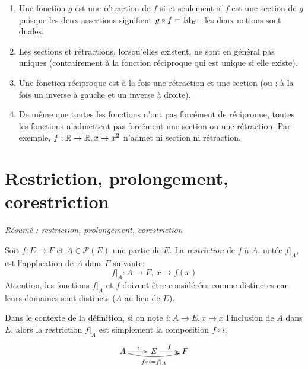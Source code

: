 \begin{remarque}
\begin{enumerate}
\item Une fonction $g$ est une rétraction de $f$ si et seulement si $f$ est une section de $g$ puisque les deux assertions signifient $g\circ f = \operatorname{Id}_E$ : les deux notions sont \og duales\fg.
\item Les sections et rétractions, lorsqu'elles existent, ne sont en général pas uniques (contrairement à la fonction réciproque qui est unique si elle existe).
\item Une fonction réciproque est à la fois une rétraction et une section (ou : à la fois un inverse à gauche et un inverse à droite).
\item De même que toutes les fonctions n'ont pas forcément de réciproque, toutes les fonctions n'admettent pas forcément une section ou une rétraction. Par exemple, $f : \mathbb{R}\to \mathbb{R}, x\mapsto x^2$ n'admet ni section ni rétraction. 
\end{enumerate}
\end{remarque}




\section{Restriction, prolongement, corestriction}

\emph{Résumé : restriction, prolongement, corestriction}

\begin{definition}[Restriction]
\label{def-restriction}
Soit $f : E\to F$ et $A \in \mathcal P(E)$ une partie de $E$. La \emph{restriction} de $f$ à $A$, notée $f|_{A}$, est l'application de $A$ dans $F$ suivante:
\[
f|_{A} : A\to F, \: x\mapsto f(x)
\]
Attention, les fonctions $f|_A$ et $f$ doivent être considérées comme distinctes car leurs domaines sont distincts ($A$ au lieu de $E$).
\end{definition}

\begin{remarque}
Dans le contexte de la définition, si on note $i : A\to E, x\mapsto x$ l'inclusion de $A$ dans $E$, alors la restriction $f|_A$ est simplement la composition $f\circ i$.
\[\xymatrix{
A \ar[r]^{i} \ar@/_/[rr]_{f\circ i = f|_A} & E \ar[r]^f & F
}\]
\end{remarque}


